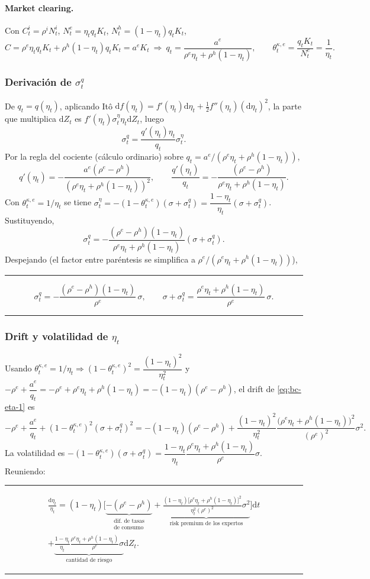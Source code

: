 \documentclass[11pt]{article}
\theoremstyle{definition}
\theoremstyle{remark}
\newenvironment{resultado}
  {\par\medskip\noindent\begin{minipage}{\linewidth}\rule{\linewidth}{0.4pt}\par\smallskip\noindent}
  {\par\smallskip\noindent\rule{\linewidth}{0.4pt}\end{minipage}\medskip\par}
\newcommand{\dd}{\mathrm{d}}
\newcommand{\aE}{a^{e}}
\newcommand{\re}{\rho^{e}}
\newcommand{\rh}{\rho^{h}}
\newcommand{\thke}{\theta_t^{\kappa,e}}
\newcommand{\sq}{\sigma_t^{q}}
\begin{document}
\paragraph{Market clearing.} Con $C_t^{i}=\rho^{i}N_t^{i}$, $N_t^{e}=\eta_tq_tK_t$, $N_t^{h}=(1-\eta_t)q_tK_t$,
\[
C=\re\eta_tq_tK_t+\rh(1-\eta_t)q_tK_t=\aE K_t
\ \Rightarrow\
q_t=\frac{\aE}{\re\eta_t+\rh(1-\eta_t)},
\qquad \thke=\frac{q_tK_t}{N_t^{e}}=\frac{1}{\eta_t}.
\]

\subsubsection*{Derivación de $\sq$}

De $q_t=q(\eta_t)$, aplicando Itô $\dd f(\eta_t)=f'(\eta_t)\dd\eta_t+\tfrac12 f''(\eta_t)(\dd\eta_t)^2$, la parte que multiplica $\dd Z_t$ es $f'(\eta_t)\sigma_t^{\eta}\eta_t\dd Z_t$, luego
\[
\sq=\frac{q'(\eta_t)\eta_t}{q_t}\sigma_t^{\eta}.
\]
Por la regla del cociente (cálculo ordinario) sobre $q_t=\aE/(\re\eta_t+\rh(1-\eta_t))$,
\[
q'(\eta_t)=-\frac{\aE(\re-\rh)}{(\re\eta_t+\rh(1-\eta_t))^2},
\qquad
\frac{q'(\eta_t)}{q_t}=-\frac{(\re-\rh)}{\re\eta_t+\rh(1-\eta_t)}.
\]
Con $\thke=1/\eta_t$ se tiene $\sigma_t^{\eta}=-(1-\thke)(\sigma+\sq)=\dfrac{1-\eta_t}{\eta_t}(\sigma+\sq)$. Sustituyendo,
\[
\sq=-\frac{(\re-\rh)(1-\eta_t)}{\re\eta_t+\rh(1-\eta_t)}(\sigma+\sq).
\]
Despejando (el factor entre paréntesis se simplifica a $\re/(\re\eta_t+\rh(1-\eta_t))$),
\begin{resultado}
\begin{equation}\label{eq:bc-sq}
\sq=-\frac{(\re-\rh)(1-\eta_t)}{\re}\,\sigma,
\qquad
\sigma+\sq=\frac{\re\eta_t+\rh(1-\eta_t)}{\re}\,\sigma.
\end{equation}
\end{resultado}

\subsubsection*{Drift y volatilidad de $\eta_t$}

Usando $\thke=1/\eta_t\Rightarrow(1-\thke)^2=\dfrac{(1-\eta_t)^2}{\eta_t^2}$ y $-\re+\dfrac{\aE}{q_t}=-\re+\re\eta_t+\rh(1-\eta_t)=-(1-\eta_t)(\re-\rh)$, el drift de \eqref{eq:bc-eta-1} es
\[
-\re+\frac{\aE}{q_t}+(1-\thke)^2(\sigma+\sq)^2
=-(1-\eta_t)(\re-\rh)+\frac{(1-\eta_t)^2}{\eta_t^2}\frac{\big(\re\eta_t+\rh(1-\eta_t)\big)^2}{(\re)^2}\sigma^2.
\]
La volatilidad es $-(1-\thke)(\sigma+\sq)=\dfrac{1-\eta_t}{\eta_t}\dfrac{\re\eta_t+\rh(1-\eta_t)}{\re}\sigma$. Reuniendo:
\begin{resultado}
\begin{multline}\label{eq:bc-eta-final}
\frac{\dd\eta_t}{\eta_t}=(1-\eta_t)\bigg[\underbrace{-(\re-\rh)}_{\substack{\text{dif.\ de tasas}\\\text{de consumo}}}
+\underbrace{\frac{(1-\eta_t)\big[\re\eta_t+\rh(1-\eta_t)\big]^2}{\eta_t^2(\re)^2}\sigma^2}_{\text{risk premium de los expertos}}\bigg]\dd t\\
+\underbrace{\frac{1-\eta_t}{\eta_t}\frac{\re\eta_t+\rh(1-\eta_t)}{\re}\sigma}_{\text{cantidad de riesgo}}\dd Z_t.
\end{multline}
\end{resultado}
\end{document}
